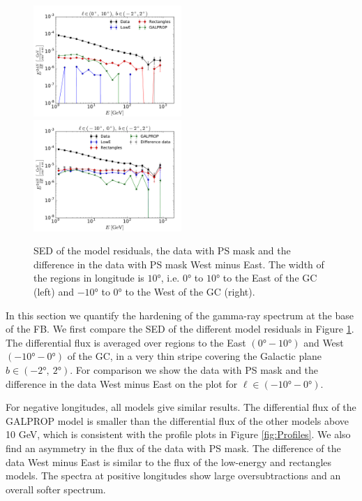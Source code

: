 \begin{figure}[h]
\includegraphics[width=0.5\textwidth]{plots/SED_all_models_source_l=5_b=0.pdf}
\includegraphics[width=0.5\textwidth]{plots/SED_all_models_source_l=-5_b=0.pdf}
  	\caption{SED of the model residuals, the data with PS mask and the difference in the data with PS mask West minus East. The width of the regions in longitude is $\ang{10}$, i.e. $\ang{0}$ to $\ang{10}$ to the East of the GC (left) and $\ang{-10}$ to $\ang{0}$ to the West of the GC (right).}
  	\label{fig:SED_all}
\end{figure}

In this section we quantify the hardening of the gamma-ray spectrum at the base of the FB. 
We first compare the SED of the different model residuals in Figure \ref{fig:SED_all}. 
The differential flux is averaged over regions to the East $(\ang{0} - \ang{10})$ and West $(\ang{-10} - \ang{0})$ of the GC, 
in a very thin stripe covering the Galactic plane $b \in (\ang{-2},\ \ang{2})$. 
For comparison we show the data with PS mask and the difference in the data West minus East
on the plot for $\ell \in (\ang{-10} - \ang{0})$.

For negative longitudes, all models give similar results. 
The differential flux of the GALPROP model is smaller than the differential flux of the other models above 10 GeV, 
which is consistent with the profile plots in Figure \ref{fig:Profiles}.
We also find an asymmetry in the flux of the data with PS mask. The difference of the data West minus East is similar to the flux of the low-energy and rectangles models. The spectra at positive longitudes show large oversubtractions and an overall softer spectrum. %

